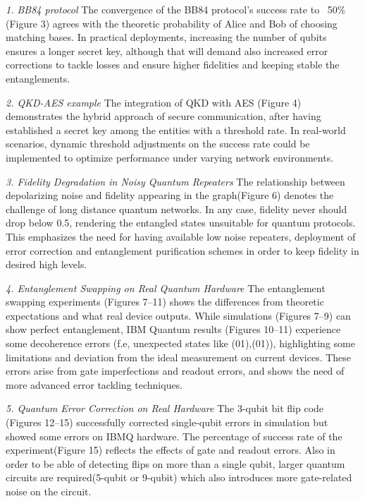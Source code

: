 \documentclass[12pt]{ieeetj}
\begin{document}
	\textit{1. BB84 protocol}
	\newline
	The convergence of the BB84 protocol’s success rate to ~50\% (Figure 3) agrees with the theoretic probability 
	of Alice and Bob of choosing matching bases. 
	In practical deployments, increasing the number of qubits ensures a longer secret key, 
	although that will demand also increased error corrections to tackle losses and ensure higher fidelities and keeping stable the entanglements.
	

	\textit{2. QKD-AES example}
	\newline
	The integration of QKD with AES (Figure 4) demonstrates the hybrid approach of secure communication, 
	after having established a secret key among the entities with a threshold rate.
	In real-world scenarios, dynamic threshold adjustments on the success rate could be implemented to
	optimize performance under varying network environments. 
	

\textit{3. Fidelity Degradation in Noisy Quantum Repeaters}
	\newline
	The relationship between depolarizing noise and fidelity appearing in the graph(Figure 6) denotes the challenge of long distance quantum networks. 
	In any case, fidelity never should drop below 0.5, rendering the entangled states unsuitable for quantum protocols. 
	This emphasizes the need for having available low noise repeaters,
	deployment of error correction and entanglement purification schemes in order to keep fidelity in desired high levels.

\textit{4. Entanglement Swapping on Real Quantum Hardware}
	\newline
	The entanglement swapping experiments (Figures 7–11) shows the differences from theoretic expectations and what real device outputs. 
	While simulations (Figures 7–9) can show perfect entanglement, IBM Quantum results (Figures 10–11) experience some decoherence errors 
	(f.e, unexpected states like (01),(01)), highlighting some limitations and deviation from the ideal measurement on current devices. 
	These errors arise from gate imperfections and readout errors, and shows the need of more advanced error tackling techniques.

\textit{5. Quantum Error Correction on Real Hardware}
	\newline
	The 3-qubit bit flip code (Figures 12–15) successfully corrected single-qubit errors in simulation 
	but showed some errors on IBMQ hardware. 
	The percentage of success rate of the experiment(Figure 15) reflects the effects of gate and readout errors. 
	Also in order to be able of detecting flips on more than a single qubit, 
	larger quantum circuits are required(5-qubit or 9-qubit) which also introduces
	more gate-related noise on the circuit.
\end{document}

